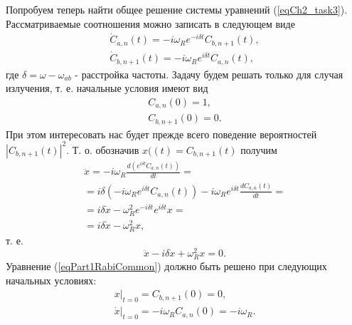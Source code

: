 Попробуем теперь найти общее решение системы уравнений
(\ref{eqCh2_task3}). Рассматриваемые соотношения можно записать в
следующем виде
\begin{eqnarray}
  {\dot C}_{a,n}\left(t\right) = -i \omega_R e^{-i \delta t} 
C_{b, n + 1}\left(t\right),
\nonumber \\
{\dot C}_{b, n + 1}\left(t\right) = -i \omega_R e^{i \delta t} 
C_{a, n}\left(t\right),
  \nonumber
\end{eqnarray}
где $\delta = \omega - \omega_{ab}$ - расстройка частоты.
Задачу будем решать только для случая излучения, т. е. начальные
условия имеют вид
\begin{eqnarray}
  C_{a,n}\left(0\right) = 1,
  \nonumber \\
  C_{b,n+1}\left(0\right) = 0.
  \nonumber
\end{eqnarray}
При этом интересовать нас будет прежде всего поведение вероятностей
$\left|C_{b, n + 1}\left(t\right)\right|^2$. Т. о.
обозначив $x(\left(t\right) = C_{b,n+1}\left(t\right)$ получим
\begin{eqnarray}
  \ddot{x} =  -i \omega_R \frac{d \left(e^{i \delta t} 
    C_{a, n}\left(t\right)\right) }{d t} =
  \nonumber \\
  = i \delta \left(- i \omega_R e^{i \delta t} 
  C_{a, n}\left(t\right) \right) -i \omega_R e^{i \delta t}
  \frac{d C_{a, n}\left(t\right)}{dt} =
  \nonumber \\
  = i \delta \dot{x} - \omega_R^2 e^{-i \delta t} e^{i \delta t} x =
  \nonumber \\
  =  i \delta \dot{x} - \omega_R^2 x,
  \nonumber
\end{eqnarray}
т. е.
\begin{equation}
  \ddot{x} -i \delta \dot{x} + \omega_R^2 x = 0.
  \label{eqPart1RabiCommon}
\end{equation}
Уравнение (\ref{eqPart1RabiCommon}) должно быть решено при следующих
начальных условиях:
\begin{eqnarray}
  \left.x\right|_{t=0} = C_{b,n+1}\left(0\right) = 0,
  \nonumber \\
  \left.\dot{x}\right|_{t=0} = -i \omega_R C_{a,n}\left(0\right) = -i \omega_R.
  \nonumber
\end{eqnarray}

